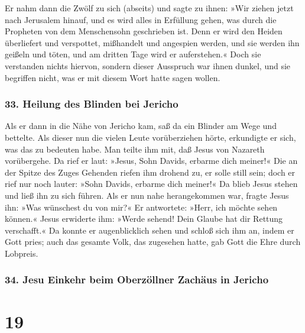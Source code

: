 Er nahm dann die Zwölf zu sich (abseits) und sagte zu
ihnen: »Wir ziehen jetzt nach Jerusalem hinauf, und es wird alles in
Erfüllung gehen, was durch die Propheten von dem Menschensohn
geschrieben ist.  Denn er wird den Heiden überliefert und
verspottet, mißhandelt und angespien werden,  und sie
werden ihn geißeln und töten, und am dritten Tage wird er auferstehen.«
 Doch sie verstanden nichts hiervon, sondern dieser
Ausspruch war ihnen dunkel, und sie begriffen nicht, was er mit diesem
Wort hatte sagen wollen.

\hypertarget{heilung-des-blinden-bei-jericho}{%
\subsubsection{33. Heilung des Blinden bei
Jericho}\label{heilung-des-blinden-bei-jericho}}

 Als er dann in die Nähe von Jericho kam, saß da ein
Blinder am Wege und bettelte.  Als dieser nun die vielen
Leute vorüberziehen hörte, erkundigte er sich, was das zu bedeuten habe.
 Man teilte ihm mit, daß Jesus von Nazareth vorübergehe.
 Da rief er laut: »Jesus, Sohn Davids, erbarme dich
meiner!«  Die an der Spitze des Zuges Gehenden riefen ihm
drohend zu, er solle still sein; doch er rief nur noch lauter: »Sohn
Davids, erbarme dich meiner!«  Da blieb Jesus stehen und
ließ ihn zu sich führen. Als er nun nahe herangekommen war, fragte Jesus
ihn:  »Was wünschest du von mir?« Er antwortete: »Herr,
ich möchte sehen können.«  Jesus erwiderte ihm: »Werde
sehend! Dein Glaube hat dir Rettung verschafft.«  Da
konnte er augenblicklich sehen und schloß sich ihm an, indem er Gott
pries; auch das gesamte Volk, das zugesehen hatte, gab Gott die Ehre
durch Lobpreis.

\hypertarget{jesu-einkehr-beim-oberzuxf6llner-zachuxe4us-in-jericho}{%
\subsubsection{34. Jesu Einkehr beim Oberzöllner Zachäus in
Jericho}\label{jesu-einkehr-beim-oberzuxf6llner-zachuxe4us-in-jericho}}

\hypertarget{section-18}{%
\section{19}\label{section-18}}

